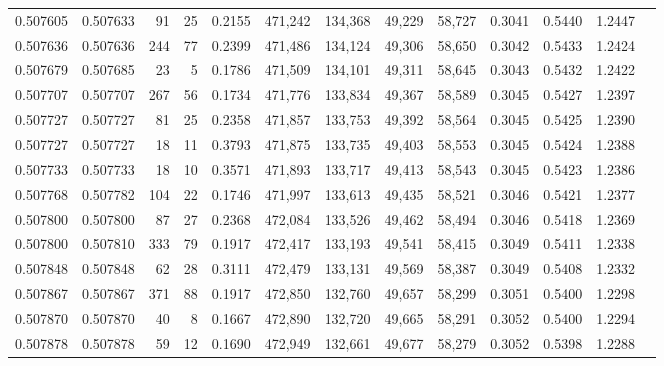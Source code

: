 \begin{tabular}{rrrrrrrrrrrrr}
0.507605 & 0.507633 &    91 &    25 &                                     0.2155 & 471,242 & 134,368 &  49,229 &  58,727 & 0.3041 & 0.5440 & 1.2447 \\
0.507636 & 0.507636 &   244 &    77 &                                     0.2399 & 471,486 & 134,124 &  49,306 &  58,650 & 0.3042 & 0.5433 & 1.2424 \\
0.507679 & 0.507685 &    23 &     5 &                                     0.1786 & 471,509 & 134,101 &  49,311 &  58,645 & 0.3043 & 0.5432 & 1.2422 \\
0.507707 & 0.507707 &   267 &    56 &                                     0.1734 & 471,776 & 133,834 &  49,367 &  58,589 & 0.3045 & 0.5427 & 1.2397 \\
0.507727 & 0.507727 &    81 &    25 &                                     0.2358 & 471,857 & 133,753 &  49,392 &  58,564 & 0.3045 & 0.5425 & 1.2390 \\
0.507727 & 0.507727 &    18 &    11 &                                     0.3793 & 471,875 & 133,735 &  49,403 &  58,553 & 0.3045 & 0.5424 & 1.2388 \\
0.507733 & 0.507733 &    18 &    10 &                                     0.3571 & 471,893 & 133,717 &  49,413 &  58,543 & 0.3045 & 0.5423 & 1.2386 \\
0.507768 & 0.507782 &   104 &    22 &                                     0.1746 & 471,997 & 133,613 &  49,435 &  58,521 & 0.3046 & 0.5421 & 1.2377 \\
0.507800 & 0.507800 &    87 &    27 &                                     0.2368 & 472,084 & 133,526 &  49,462 &  58,494 & 0.3046 & 0.5418 & 1.2369 \\
0.507800 & 0.507810 &   333 &    79 &                                     0.1917 & 472,417 & 133,193 &  49,541 &  58,415 & 0.3049 & 0.5411 & 1.2338 \\
0.507848 & 0.507848 &    62 &    28 &                                     0.3111 & 472,479 & 133,131 &  49,569 &  58,387 & 0.3049 & 0.5408 & 1.2332 \\
0.507867 & 0.507867 &   371 &    88 &                                     0.1917 & 472,850 & 132,760 &  49,657 &  58,299 & 0.3051 & 0.5400 & 1.2298 \\
0.507870 & 0.507870 &    40 &     8 &                                     0.1667 & 472,890 & 132,720 &  49,665 &  58,291 & 0.3052 & 0.5400 & 1.2294 \\
0.507878 & 0.507878 &    59 &    12 &                                     0.1690 & 472,949 & 132,661 &  49,677 &  58,279 & 0.3052 & 0.5398 & 1.2288 \\

\end{tabular}
